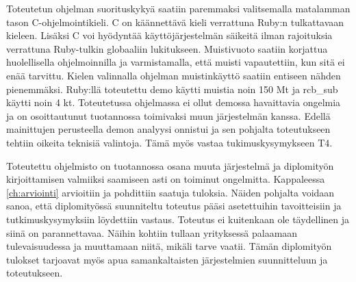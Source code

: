 Toteutetun ohjelman suorituskykyä saatiin paremmaksi valitsemalla matalamman tason C-ohjelmointikieli. C on käännettävä kieli verrattuna Ruby:n tulkattavaan kieleen. Lisäksi C voi hyödyntää käyttöjärjestelmän säikeitä ilman rajoituksia verrattuna Ruby-tulkin globaaliin lukitukseen. Muistivuoto saatiin korjattua huolellisella ohjelmoinnilla ja varmistamalla, että muisti vapautettiin, kun sitä ei enää tarvittu. Kielen valinnalla ohjelman muistinkäyttö saatiin entiseen nähden pienemmäksi. Ruby:llä toteutettu demo käytti muistia noin 150 Mt ja rcb\_sub käytti noin 4 kt. Toteutetussa ohjelmassa ei ollut demossa havaittavia ongelmia ja on osoittautunut tuotannossa toimivaksi muun järjestelmän kanssa. Edellä mainittujen perusteella demon analyysi onnistui ja sen pohjalta toteutukseen tehtiin oikeita teknisiä valintoja. Tämä myös vastaa tukimuskysymykseen T4.

Toteutettu ohjelmisto on tuotannossa osana muuta järjestelmä ja diplomityön kirjoittamisen valmiiksi saamiseen asti on toiminut ongelmitta. Kappaleessa \ref{ch:arviointi} arvioitiin ja pohdittiin saatuja tuloksia. Näiden pohjalta voidaan sanoa, että diplomityössä suunniteltu toteutus pääsi asetettuihin tavoitteisiin ja tutkimuskysymyksiin löydettiin vastaus. Toteutus ei kuitenkaan ole täydellinen ja siinä on parannettavaa. Näihin kohtiin tullaan yrityksessä palaamaan tulevaisuudessa ja muuttamaan niitä, mikäli tarve vaatii. Tämän diplomityön tulokset tarjoavat myös apua samankaltaisten järjestelmien suunnitteluun ja toteutukseen.